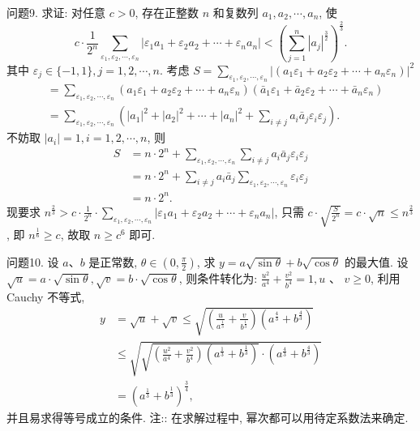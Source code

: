 问题9. 求证: 对任意 $c>0$, 存在正整数 $n$ 和复数列 $a_1, a_2, \cdots, a_n$, 使
$$
c \cdot \frac{1}{2^n} \sum_{\varepsilon_1, \varepsilon_2, \cdots, \varepsilon_n}\left|\varepsilon_1 a_1+\varepsilon_2 a_2+\cdots+\varepsilon_n a_n\right|<\left(\sum_{j=1}^n\left|a_j\right|^{\frac{3}{2}}\right)^{\frac{2}{3}} .
$$
其中 $\varepsilon_j \in\{-1,1\}, j=1,2, \cdots, n$.
考虑 $S=\sum_{\varepsilon_1, \varepsilon_2, \cdots, \varepsilon_n}\left|\left(a_1 \varepsilon_1+a_2 \varepsilon_2+\cdots+a_n \varepsilon_n\right)\right|^2$
$$
\begin{aligned}
& =\sum_{\varepsilon_1, \varepsilon_2, \cdots, \varepsilon_n}\left(a_1 \varepsilon_1+a_2 \varepsilon_2+\cdots+a_n \varepsilon_n\right)\left(\bar{a}_1 \varepsilon_1+\bar{a}_2 \varepsilon_2+\cdots+\bar{a}_n \varepsilon_n\right) \\
& =\sum_{\varepsilon_1, \varepsilon_2, \cdots, \varepsilon_n}\left(\left|a_1\right|^2+\left|a_2\right|^2+\cdots+\left|a_n\right|^2+\sum_{i \neq j} a_i \bar{a}_j \varepsilon_i \varepsilon_j\right) .
\end{aligned}
$$
不妨取 $\left|a_i\right|=1, i=1,2, \cdots, n$, 则
$$
\begin{aligned}
S & =n \cdot 2^n+\sum_{\varepsilon_1, \varepsilon_2, \cdots, \varepsilon_n} \sum_{i \neq j} a_i \bar{a}_j \varepsilon_i \varepsilon_j \\
& =n \cdot 2^n+\sum_{i \neq j} a_i \bar{a}_j \sum_{\varepsilon_1, \varepsilon_2, \cdots, \varepsilon_n} \varepsilon_i \varepsilon_j \\
& =n \cdot 2^n .
\end{aligned}
$$
现要求 $n^{\frac{2}{3}}>c \cdot \frac{1}{2^n} \cdot \sum_{\varepsilon_1, \varepsilon_2, \cdots, \varepsilon_n}\left|\varepsilon_1 a_1+\varepsilon_2 a_2+\cdots+\varepsilon_n a_n\right|$, 只需 $c \cdot \sqrt{\frac{S}{2^n}}= c \cdot \sqrt{n} \leqslant n^{\frac{2}{3}}$, 即 $n^{\frac{1}{6}} \geqslant c$, 故取 $n \geqslant c^6$ 即可.



问题10. 设 $a 、 b$ 是正常数, $\theta \in\left(0, \frac{\pi}{2}\right)$, 求 $y=a \sqrt{\sin \theta}+b \sqrt{\cos \theta}$ 的最大值.
设 $\sqrt{u}=a \cdot \sqrt{\sin \theta}, \sqrt{v}=b \cdot \sqrt{\cos \theta}$, 则条件转化为: $\frac{u^2}{a^4}+\frac{v^2}{b^4}=1, u$ 、 $v \geqslant 0$, 利用 Cauchy 不等式,
$$
\begin{aligned}
y & =\sqrt{u}+\sqrt{v} \leqslant \sqrt{\left(\frac{u}{a^{\frac{1}{3}}}+\frac{v}{b^{\frac{1}{3}}}\right)\left(a^{\frac{4}{3}}+b^{\frac{4}{3}}\right)} \\
& \leqslant \sqrt{\sqrt{\left(\frac{u^2}{a^4}+\frac{v^2}{b^4}\right)\left(a^{\frac{1}{3}}+b^{\frac{1}{3}}\right)} \cdot\left(a^{\frac{4}{3}}+b^{\frac{4}{3}}\right)} \\
& =\left(a^{\frac{1}{3}}+b^{\frac{1}{3}}\right)^{\frac{3}{4}},
\end{aligned}
$$
并且易求得等号成立的条件.
注:: 在求解过程中, 幂次都可以用待定系数法来确定.



